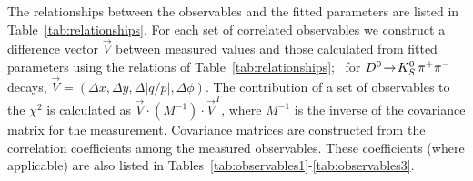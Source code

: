 The relationships between the observables and the fitted
parameters are listed in Table~\ref{tab:relationships}. 
For each set of correlated observables we construct a
difference vector $\vec{V}$ between measured values and
those calculated from fitted parameters using the
relations of Table~\ref{tab:relationships}; \eg\ for 
$D^0\!\rightarrow\! K^0_S\,\pi^+\pi^-$ decays,
$\vec{V}=(\Delta x,\Delta y,\Delta |q/p|,\Delta \phi)$.
The contribution of a set of observables to the $\chi^2$ 
is calculated as $\vec{V}\cdot (M^{-1})\cdot\vec{V}^T$, 
where $M^{-1}$ is the inverse of the covariance matrix 
for the measurement. Covariance matrices are constructed 
from the correlation coefficients among the measured observables.
These coefficients (where applicable) are also listed in 
Tables~\ref{tab:observables1}-\ref{tab:observables3}. 


